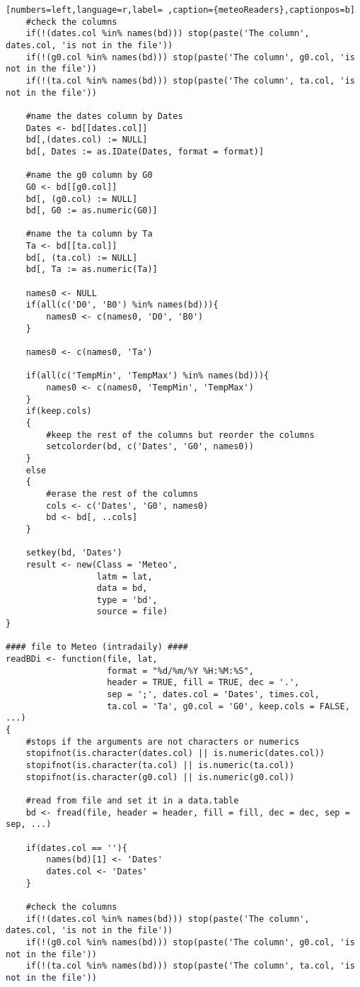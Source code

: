 \begin{lstlisting}[numbers=left,language=r,label= ,caption={meteoReaders},captionpos=b]
    #check the columns
    if(!(dates.col %in% names(bd))) stop(paste('The column', dates.col, 'is not in the file'))
    if(!(g0.col %in% names(bd))) stop(paste('The column', g0.col, 'is not in the file'))
    if(!(ta.col %in% names(bd))) stop(paste('The column', ta.col, 'is not in the file'))

    #name the dates column by Dates
    Dates <- bd[[dates.col]]
    bd[,(dates.col) := NULL]
    bd[, Dates := as.IDate(Dates, format = format)]

    #name the g0 column by G0
    G0 <- bd[[g0.col]]
    bd[, (g0.col) := NULL]
    bd[, G0 := as.numeric(G0)]

    #name the ta column by Ta
    Ta <- bd[[ta.col]]
    bd[, (ta.col) := NULL]
    bd[, Ta := as.numeric(Ta)]

    names0 <- NULL
    if(all(c('D0', 'B0') %in% names(bd))){
        names0 <- c(names0, 'D0', 'B0')
    }

    names0 <- c(names0, 'Ta')

    if(all(c('TempMin', 'TempMax') %in% names(bd))){
        names0 <- c(names0, 'TempMin', 'TempMax')
    }
    if(keep.cols)
    {
        #keep the rest of the columns but reorder the columns
        setcolorder(bd, c('Dates', 'G0', names0))
    }
    else
    {
        #erase the rest of the columns
        cols <- c('Dates', 'G0', names0)
        bd <- bd[, ..cols]
    }

    setkey(bd, 'Dates')
    result <- new(Class = 'Meteo',
                  latm = lat,
                  data = bd,
                  type = 'bd',
                  source = file)
}

#### file to Meteo (intradaily) ####
readBDi <- function(file, lat,
                    format = "%d/%m/%Y %H:%M:%S",
                    header = TRUE, fill = TRUE, dec = '.',
                    sep = ';', dates.col = 'Dates', times.col,
                    ta.col = 'Ta', g0.col = 'G0', keep.cols = FALSE, ...)
{
    #stops if the arguments are not characters or numerics
    stopifnot(is.character(dates.col) || is.numeric(dates.col))
    stopifnot(is.character(ta.col) || is.numeric(ta.col))
    stopifnot(is.character(g0.col) || is.numeric(g0.col))

    #read from file and set it in a data.table
    bd <- fread(file, header = header, fill = fill, dec = dec, sep = sep, ...)

    if(dates.col == ''){
        names(bd)[1] <- 'Dates'
        dates.col <- 'Dates'
    }

    #check the columns
    if(!(dates.col %in% names(bd))) stop(paste('The column', dates.col, 'is not in the file'))
    if(!(g0.col %in% names(bd))) stop(paste('The column', g0.col, 'is not in the file'))
    if(!(ta.col %in% names(bd))) stop(paste('The column', ta.col, 'is not in the file'))


\end{lstlisting}
